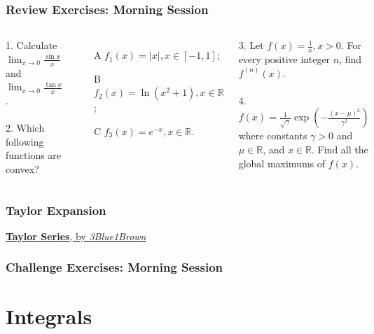 \documentclass{beamer}
\begin{document}
\begin{frame}
\frametitle{Review Exercises: Morning Session}
\begin{columns}[t] %

1. Calculate $\lim_{x \rightarrow 0} \frac{\sin x}{x}$ and $\lim_{x \rightarrow 0} \frac{\tan x}{x}$.
\\~\\
2. Which following functions are convex?
\begin{itemize}
\item[A] $f_1(x) = \vert x \vert, x\in [-1,1]$;
\item[B] $f_2(x) = \ln(x^2+1), x \in \mathbb{R}$;
\item[C] $f_3(x) = e^{-x}, x\in \mathbb{R}$.
\end{itemize}

3. Let $f(x) = \frac{1}{x}, x>0$. For every positive integer $n$, find $f^{(n)}(x)$.
\\~\\
4. $f(x) = \frac{1}{\sqrt{\gamma}} \exp \left(-\frac{(x-\mu)^2}{\gamma^2}\right)$ where constants $\gamma > 0$ and $\mu \in \mathbb{R}$, and $x\in \mathbb{R}$. Find all the global maximums of $f(x)$.

\end{columns}
\end{frame}

\begin{frame}
\frametitle{Taylor Expansion}

\href{https://youtu.be/3d6DsjIBzJ4}{\textbf{Taylor Series}, by \textit{3Blue1Brown}}
\end{frame}

\begin{frame}
\frametitle{Challenge Exercises: Morning Session}
\end{frame}


\section{Integrals}
\end{document}
